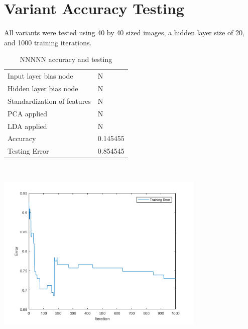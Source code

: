 \documentclass[12pt]{article}
\newcommand{\accuracyAndTestErrorTable}[8]{
  \begin{tabular}{l|l}
    \hline
    Input layer bias node & #1 \\
    Hidden layer bias node & #2 \\
    Standardization of features & #3 \\
    PCA applied & #4 \\
    LDA applied & #5 \\
    \hline
    Accuracy & #6 \\
    Testing Error & #7 \\
    \hline
  \end{tabular}
  ~\\[60pt]
  \caption{#8}
}
\begin{document}
\section{Variant Accuracy Testing}
All variants were tested using 40 by 40 sized images, a hidden layer size of 20, and 1000 training iterations.
\begin{center}
  \begin{table}[H]
    \begin{varwidth}[b]{0.4\linewidth}
      \centering
      \accuracyAndTestErrorTable{N}{N}{N}{N}{N}{0.145455}{0.854545}{NNNNN accuracy and testing}
      \label{table:NNNNN}
    \end{varwidth}%
    \hfill
    \begin{minipage}[b]{0.6\linewidth}
      \centering
      \includegraphics[width=100mm]{NNNNN_training_error.png}
      \label{fig:NNNNN}
    \end{minipage}
  \end{table}
\end{center}
\end{document}

